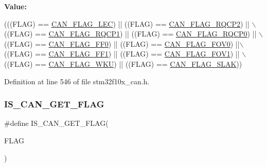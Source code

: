 {\bfseries Value\+:}
\begin{DoxyCode}
(((FLAG) == \hyperlink{group___c_a_n__flags_ga73a774fa4d391aec0ea6552bf9372917}{CAN\_FLAG\_LEC}) || ((FLAG) == \hyperlink{group___c_a_n__flags_ga9c20cd47e558135bd7ae71149583d487}{CAN\_FLAG\_RQCP2}) || \(\backslash\)
                                ((FLAG) == \hyperlink{group___c_a_n__flags_gaba705586ebc3d961507436c03a2feaba}{CAN\_FLAG\_RQCP1})  || ((FLAG) == 
      \hyperlink{group___c_a_n__flags_ga6df0579049eb471720ea103c5446298b}{CAN\_FLAG\_RQCP0}) || \(\backslash\)
                                ((FLAG) == \hyperlink{group___c_a_n__flags_ga11648741ff43af1561ce7009698fb797}{CAN\_FLAG\_FF0})  || ((FLAG) == 
      \hyperlink{group___c_a_n__flags_ga2abd66b5e0032132673208decd2d01f2}{CAN\_FLAG\_FOV0}) ||\(\backslash\)
                                ((FLAG) == \hyperlink{group___c_a_n__flags_ga0fa967743c5db04189bb2160aa48e371}{CAN\_FLAG\_FF1}) || ((FLAG) == 
      \hyperlink{group___c_a_n__flags_gac1af6e61b1285ddc4658c4bcc152719a}{CAN\_FLAG\_FOV1}) || \(\backslash\)
                                ((FLAG) == \hyperlink{group___c_a_n__flags_ga18c72dbe75cb80e8b5126c23c9120818}{CAN\_FLAG\_WKU}) || ((FLAG) == 
      \hyperlink{group___c_a_n__flags_gad087b5025a3d5ead2c32b06663821cf4}{CAN\_FLAG\_SLAK}))
\end{DoxyCode}


Definition at line 546 of file stm32f10x\+\_\+can.\+h.

\mbox{\label{group___c_a_n__flags_ga38d33d1762ed3a331d214cdb3249866e}} 
\subsubsection{\texorpdfstring{I\+S\+\_\+\+C\+A\+N\+\_\+\+G\+E\+T\+\_\+\+F\+L\+AG}{IS\_CAN\_GET\_FLAG}}
{\footnotesize\ttfamily \#define I\+S\+\_\+\+C\+A\+N\+\_\+\+G\+E\+T\+\_\+\+F\+L\+AG(\begin{DoxyParamCaption}\item[{}]{F\+L\+AG }\end{DoxyParamCaption})}

